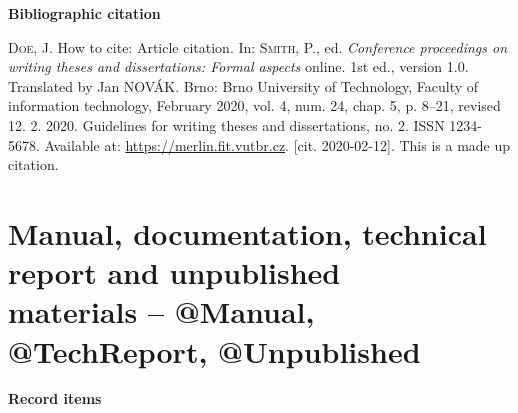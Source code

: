 \bigskip

\noindent \textbf{Bibliographic citation}

\medskip

\noindent \textsc{Doe}, J. How to cite: Article citation.
In: \textsc{Smith}, P., ed. \textit{Conference proceedings on writing theses and dissertations: Formal aspects} online. 1st ed., version 1.0. Translated by Jan NOVÁK. Brno: Brno University of Technology, Faculty of information technology, February 2020, vol. 4, num. 24, chap. 5, p. 8–21, revised 12. 2. 2020. Guidelines for writing theses and dissertations, no. 2. ISSN 1234-5678. Available at: \url{https://merlin.fit.vutbr.cz}. [cit. 2020-02-12].  This is a made up citation. 
\newpage
\section*{Manual, documentation, technical report and unpublished \\materials -- @Manual, @TechReport, @Unpublished}
\label{pr-manual}
\noindent \textbf{Record items}

\medskip

